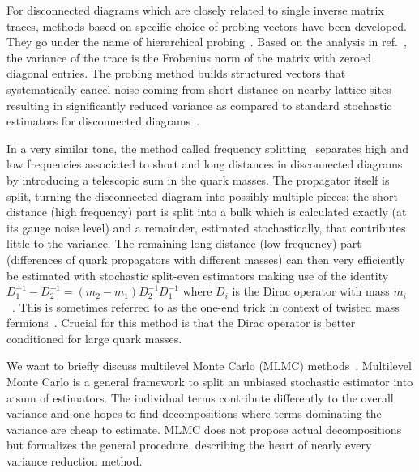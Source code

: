 For disconnected diagrams which are closely related to single inverse matrix traces, methods based on specific choice of probing vectors have been developed.
They go under the name of hierarchical probing~\cite{tang2012probing,Stathopoulos:2013aci}.
Based on the analysis in ref.~\cite{Hutchinson01011990}, the variance of the trace is the Frobenius norm of the matrix with zeroed diagonal entries.
The probing method builds structured vectors that systematically cancel noise coming from short distance on nearby lattice sites resulting in significantly reduced variance as compared to standard stochastic estimators for disconnected diagrams~\cite{Stathopoulos:2013aci}.


In a very similar tone, the method called frequency splitting~\cite{Giusti:2019kff,Giusti:2020dtz} separates high and low frequencies associated to short and long distances in disconnected diagrams by introducing a telescopic sum in the quark masses.
The propagator itself is split, turning the disconnected diagram into possibly multiple pieces; the short distance (high frequency) part is split into a bulk which is calculated exactly (\ie at its gauge noise level) and a remainder, estimated stochastically, that contributes little to the variance.
The remaining long distance (low frequency) part (differences of quark propagators with different masses) can then very efficiently be estimated with stochastic split-even estimators making use of the identity $D_1^{-1} - D_2^{-1} = (m_2 - m_1) D_2^{-1} D_1^{-1}$ where $D_i$ is the Dirac operator with mass $m_i$~\cite{Whyte:2022vrk}.
This is sometimes referred to as the one-end trick in context of twisted mass fermions~\cite{ETM:2008zte,PhysRevD.73.074506,PhysRevD.59.074503}.
Crucial for this method is that the Dirac operator is better conditioned for large quark masses.


We want to briefly discuss multilevel Monte Carlo (MLMC) methods~\cite{giles2008,Giles_2015}.
Multilevel Monte Carlo is a general framework to split an unbiased stochastic estimator into a sum of estimators.
The individual terms contribute differently to the overall variance and one hopes to find decompositions where terms dominating the variance are cheap to estimate.
MLMC does not propose actual decompositions but formalizes the general procedure, describing the heart of nearly every variance reduction method.

